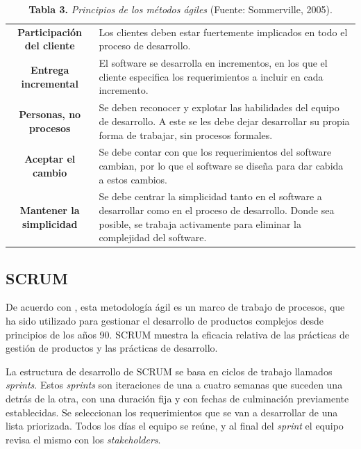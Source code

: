 \FloatBarrier %
	\begin{table}[htb]
		\small
		\caption{\textbf{Tabla 3.} \textit{Principios de los m\'{e}todos \'{a}giles} (Fuente: Sommerville, 2005).}
		\centering
		\setlength{\extrarowheight}{\altocelda}
		\begin{tabulary}{\anchotabla}{|c|J|}
			\hline
			 & \\ \hline
			\textbf{Participaci\'{o}n del cliente} & Los clientes deben estar fuertemente implicados en todo el proceso de desarrollo.\\ \hline
			\textbf{Entrega incremental} & El software se desarrolla en incrementos, en los que el cliente especifica los requerimientos a incluir en cada incremento.\\ \hline
			\textbf{Personas, no procesos} & Se deben reconocer y explotar las habilidades del equipo de desarrollo. A este se les debe dejar desarrollar su propia forma de trabajar, sin procesos formales.\\ \hline
			\textbf{Aceptar el cambio} & Se debe contar con que los requerimientos del software cambian, por lo que el software se dise\~{n}a para dar cabida a estos cambios.\\ \hline
			\textbf{Mantener la simplicidad} & Se debe centrar la simplicidad tanto en el software a desarrollar como en el proceso de desarrollo. Donde sea posible, se trabaja activamente para eliminar la complejidad del software.\\ \hline
		\end{tabulary}
	\end{table}
\FloatBarrier %

		\subsection{SCRUM}
De acuerdo con \cite{Schwaber&Sutherland}, esta metodolog\'{i}a \'{a}gil es un marco de trabajo de procesos, que ha sido utilizado para gestionar el desarrollo de productos complejos desde principios de los a\~{n}os 90. SCRUM muestra la eficacia relativa de las pr\'{a}cticas de gesti\'{o}n de productos y las pr\'{a}cticas de desarrollo.

La estructura de desarrollo de SCRUM se basa en ciclos de trabajo llamados \textit{sprints}. Estos \textit{sprints} son iteraciones de una a cuatro semanas que suceden una detr\'{a}s de la otra, con una duraci\'{o}n fija y con fechas de culminaci\'{o}n previamente establecidas. Se seleccionan los requerimientos que se van a desarrollar de una lista priorizada. Todos los d\'{i}as el equipo se re\'{u}ne, y al final del \textit{sprint} el equipo revisa el mismo con los \textit{stakeholders}.

